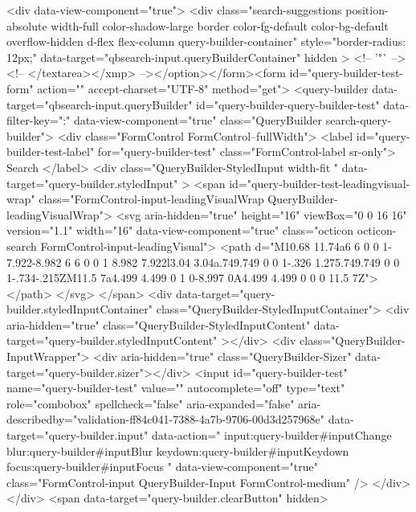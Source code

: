 {{          <div data-view-component="true">        <div class="search-suggestions position-absolute width-full color-shadow-large border color-fg-default color-bg-default overflow-hidden d-flex flex-column query-builder-container"
          style="border-radius: 12px;"
          data-target="qbsearch-input.queryBuilderContainer"
          hidden
        >
          <!-- '"` --><!-- </textarea></xmp> --></option></form><form id="query-builder-test-form" action="" accept-charset="UTF-8" method="get">
  <query-builder data-target="qbsearch-input.queryBuilder" id="query-builder-query-builder-test" data-filter-key=":" data-view-component="true" class="QueryBuilder search-query-builder">
    <div class="FormControl FormControl--fullWidth">
      <label id="query-builder-test-label" for="query-builder-test" class="FormControl-label sr-only">
        Search
      </label>
      <div
        class="QueryBuilder-StyledInput width-fit "
        data-target="query-builder.styledInput"
      >
          <span id="query-builder-test-leadingvisual-wrap" class="FormControl-input-leadingVisualWrap QueryBuilder-leadingVisualWrap">
            <svg aria-hidden="true" height="16" viewBox="0 0 16 16" version="1.1" width="16" data-view-component="true" class="octicon octicon-search FormControl-input-leadingVisual">
    <path d="M10.68 11.74a6 6 0 0 1-7.922-8.982 6 6 0 0 1 8.982 7.922l3.04 3.04a.749.749 0 0 1-.326 1.275.749.749 0 0 1-.734-.215ZM11.5 7a4.499 4.499 0 1 0-8.997 0A4.499 4.499 0 0 0 11.5 7Z"></path>
</svg>
          </span>
        <div data-target="query-builder.styledInputContainer" class="QueryBuilder-StyledInputContainer">
          <div
            aria-hidden="true"
            class="QueryBuilder-StyledInputContent"
            data-target="query-builder.styledInputContent"
          ></div>
          <div class="QueryBuilder-InputWrapper">
            <div aria-hidden="true" class="QueryBuilder-Sizer" data-target="query-builder.sizer"></div>
            <input id="query-builder-test" name="query-builder-test" value="" autocomplete="off" type="text" role="combobox" spellcheck="false" aria-expanded="false" aria-describedby="validation-ff84c041-7388-4a7b-9706-00d3d257968e" data-target="query-builder.input" data-action="
          input:query-builder#inputChange
          blur:query-builder#inputBlur
          keydown:query-builder#inputKeydown
          focus:query-builder#inputFocus
        " data-view-component="true" class="FormControl-input QueryBuilder-Input FormControl-medium" />
          </div>
        </div>
          <span data-target="query-builder.clearButton" hidden>
}}
